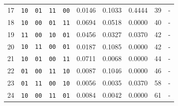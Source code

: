 \begin{center}
{\begin{tabular}{rccccrrrrl}
17 & \texttt{10} & \texttt{01} & \texttt{11} & \texttt{00} & 0.0146 & 0.1033 & 0.4444 & 39 & - \\
18 & \texttt{10} & \texttt{00} & \texttt{01} & \texttt{11} & 0.0694 & 0.0518 & 0.0000 & 40 & - \\
19 & \texttt{11} & \texttt{00} & \texttt{10} & \texttt{01} & 0.0456 & 0.0327 & 0.0370 & 42 & - \\
20 & \texttt{10} & \texttt{11} & \texttt{00} & \texttt{01} & 0.0187 & 0.1085 & 0.0000 & 42 & - \\
21 & \texttt{10} & \texttt{01} & \texttt{00} & \texttt{11} & 0.0711 & 0.0068 & 0.0000 & 44 & - \\
22 & \texttt{01} & \texttt{00} & \texttt{11} & \texttt{10} & 0.0087 & 0.1046 & 0.0000 & 46 & - \\
23 & \texttt{01} & \texttt{11} & \texttt{00} & \texttt{10} & 0.0056 & 0.0035 & 0.0370 & 58 & - \\
24 & \texttt{10} & \texttt{00} & \texttt{11} & \texttt{01} & 0.0084 & 0.0042 & 0.0000 & 61 & - \\
\bottomrule
\end{tabular}
}
\end{center}

